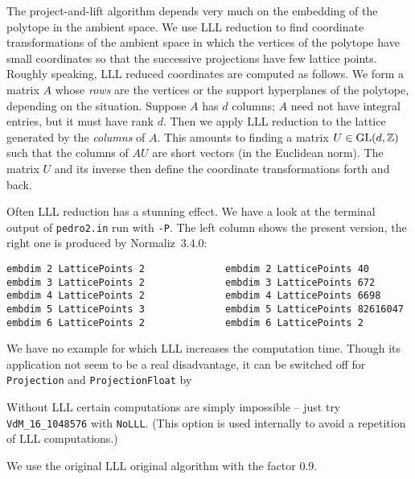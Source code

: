 The project-and-lift algorithm depends very much on the embedding of the polytope in the ambient space. We use LLL reduction to find coordinate transformations of the ambient space in which the vertices of the polytope have small coordinates so that the successive projections have few lattice points. Roughly speaking, LLL reduced coordinates are computed as follows. We form a matrix $A$ whose \emph{rows} are the vertices or the support hyperplanes of the polytope, depending on the situation. Suppose $A$ has $d$ columns; $A$ need not have integral entries, but it must have rank $d$. Then we apply LLL reduction to the lattice generated by the \emph{columns} of $A$. This amounts to finding a matrix $U\in \operatorname{GL}(d,{\mathbb Z})$ such that the columns of $AU$ are short vectors (in the Euclidean norm). The matrix $U$ and its inverse then define the coordinate transformations forth and back.

Often LLL reduction has a stunning effect. We have a look at the terminal output of \verb|pedro2.in| run with \verb|-P|. The left column shows the present version, the right one is produced by Normaliz~3.4.0:
\begin{Verbatim}
embdim 2 LatticePoints 2              embdim 2 LatticePoints 40
embdim 3 LatticePoints 2              embdim 3 LatticePoints 672
embdim 4 LatticePoints 2              embdim 4 LatticePoints 6698
embdim 5 LatticePoints 3              embdim 5 LatticePoints 82616047
embdim 6 LatticePoints 2              embdim 6 LatticePoints 2
\end{Verbatim}

We have no example for which LLL increases the computation time. Though its application not seem to be a real disadvantage, it can be switched off for \verb|Projection| and \verb|ProjectionFloat| by
\begin{itemize}
	\itemtt[NoLLL]
\end{itemize}
Without LLL certain computations are simply impossible -- just try \verb|VdM_16_1048576| with \verb|NoLLL|. (This option is used internally to avoid a repetition of LLL computations.)

We use the original LLL original algorithm with the factor $0.9$.

